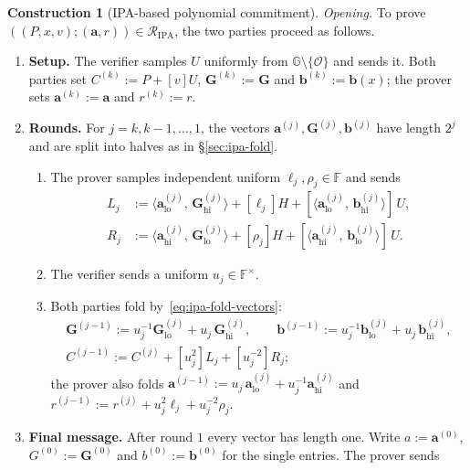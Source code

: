 \documentclass[11pt,a4paper]{article}
\theoremstyle{definition}
\newtheorem{construction}[theorem]{Construction}
\newcommand{\F}{\mathbb{F}}
\newcommand{\G}{\mathbb{G}}
\newcommand{\ip}[2]{\langle #1,\, #2 \rangle}
\newcommand{\Rel}{\mathcal{R}}
\begin{document}
\begin{construction}[IPA-based polynomial commitment]
\emph{Opening.} To prove $((P, x, v); (\mathbf a, r)) \in
\Rel_{\mathrm{IPA}}$, the two parties proceed as follows.
\begin{enumerate}[leftmargin=*, itemsep=2pt]
\item \textbf{Setup.} The verifier samples $U$ uniformly from
  $\G \setminus \{\mathcal O\}$ and sends it. Both parties set
  $C^{(k)} := P + [v]U$, $\mathbf G^{(k)} := \mathbf G$ and
  $\mathbf b^{(k)} := \mathbf b(x)$; the prover sets
  $\mathbf a^{(k)} := \mathbf a$ and $r^{(k)} := r$.
\item \textbf{Rounds.} For $j = k, k-1, \dots, 1$, the vectors
  $\mathbf a^{(j)}, \mathbf G^{(j)}, \mathbf b^{(j)}$ have length $2^{j}$
  and are split into halves as in \S\ref{sec:ipa-fold}.
  \begin{enumerate}[leftmargin=*, itemsep=1pt]
  \item The prover samples independent uniform $\ell_j, \rho_j \in \F$
    and sends
    \begin{align*}
    L_j &:= \ip{\mathbf a^{(j)}_{\mathrm{lo}}}{\mathbf G^{(j)}_{\mathrm{hi}}}
      + [\ell_j]H
      + [\ip{\mathbf a^{(j)}_{\mathrm{lo}}}
           {\mathbf b^{(j)}_{\mathrm{hi}}}]\,U, \\
    R_j &:= \ip{\mathbf a^{(j)}_{\mathrm{hi}}}{\mathbf G^{(j)}_{\mathrm{lo}}}
      + [\rho_j]H
      + [\ip{\mathbf a^{(j)}_{\mathrm{hi}}}{\mathbf b^{(j)}_{\mathrm{lo}}}]\,U .
    \end{align*}
  \item The verifier sends a uniform $u_j \in \F^\times$.
  \item Both parties fold by~\eqref{eq:ipa-fold-vectors}:
    \begin{gather*}
    \mathbf G^{(j-1)} := u_j^{-1}\mathbf G^{(j)}_{\mathrm{lo}}
      + u_j\,\mathbf G^{(j)}_{\mathrm{hi}},
    \qquad
    \mathbf b^{(j-1)} := u_j^{-1}\mathbf b^{(j)}_{\mathrm{lo}}
      + u_j\,\mathbf b^{(j)}_{\mathrm{hi}}, \\
    C^{(j-1)} := C^{(j)} + [u_j^{2}]L_j + [u_j^{-2}]R_j ;
    \end{gather*}
    the prover also folds
    $\mathbf a^{(j-1)} := u_j\,\mathbf a^{(j)}_{\mathrm{lo}}
      + u_j^{-1}\mathbf a^{(j)}_{\mathrm{hi}}$ and
    $r^{(j-1)} := r^{(j)} + u_j^{2}\ell_j + u_j^{-2}\rho_j$.
  \end{enumerate}
\item \textbf{Final message.} After round $1$ every vector has length
  one. Write $a := \mathbf a^{(0)}$, $G^{(0)} := \mathbf G^{(0)}$ and
  $b^{(0)} := \mathbf b^{(0)}$ for the single entries. The prover sends

\end{enumerate}
\end{construction}
\end{document}
